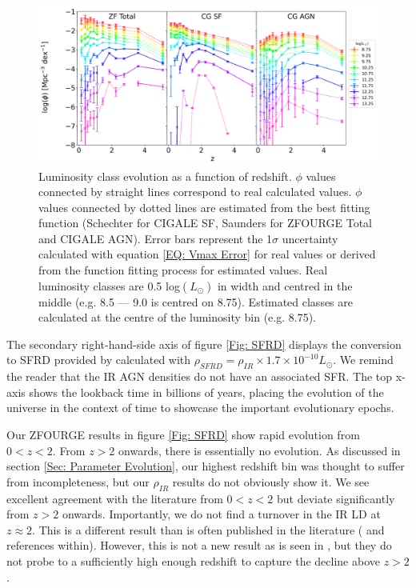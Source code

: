 \begin{figure}
    \centering
    \includegraphics[width=\textwidth]{Figures/Class Evo.png}
    \caption{Luminosity class evolution as a function of redshift. $\phi$ values connected by straight lines correspond to real calculated values. $\phi$ values connected by dotted lines are estimated from the best fitting function (Schechter for CIGALE SF, Saunders for ZFOURGE Total and CIGALE AGN). Error bars represent the 1$\sigma$ uncertainty calculated with equation \ref{EQ: Vmax Error} for real values or derived from the function fitting process for estimated values. Real luminosity classes are 0.5 log$(L_{\odot})$ in width and centred in the middle (e.g. 8.5 --- 9.0 is centred on 8.75). Estimated classes are calculated at the centre of the luminosity bin (e.g. 8.75).}
    \label{Fig: Class Evo}
\end{figure}

The secondary right-hand-side axis of figure \ref{Fig: SFRD} displays the conversion to SFRD provided by \cite{kennicutt_global_1998} calculated with $\rho_{SFRD} = \rho_{IR} \times 1.7\times10^{-10} L_{\odot}$. We remind the reader that the IR AGN densities do not have an associated SFR. The top x-axis shows the lookback time in billions of years, placing the evolution of the universe in the context of time to showcase the important evolutionary epochs.

Our ZFOURGE results in figure \ref{Fig: SFRD} show rapid evolution from $0<z<2$. From $z>2$ onwards, there is essentially no evolution. As discussed in section \ref{Sec: Parameter Evolution}, our highest redshift bin was thought to suffer from incompleteness, but our $\rho_{IR}$ results do not obviously show it. We see excellent agreement with the literature from $0<z<2$ but deviate significantly from $z>2$ onwards. Importantly, we do not find a turnover in the IR LD at $z\approx2$. This is a different result than is often published in the literature (\citealp{gruppioni_herschel_2013, madau_cosmic_2014, magnelli_deepest_2013, lutz_far-infrared_2014} and references within). However, this is not a new result as is seen in \cite{rodighiero_mid-_2010}, but they do not probe to a sufficiently high enough redshift to capture the decline above $z>2$.

